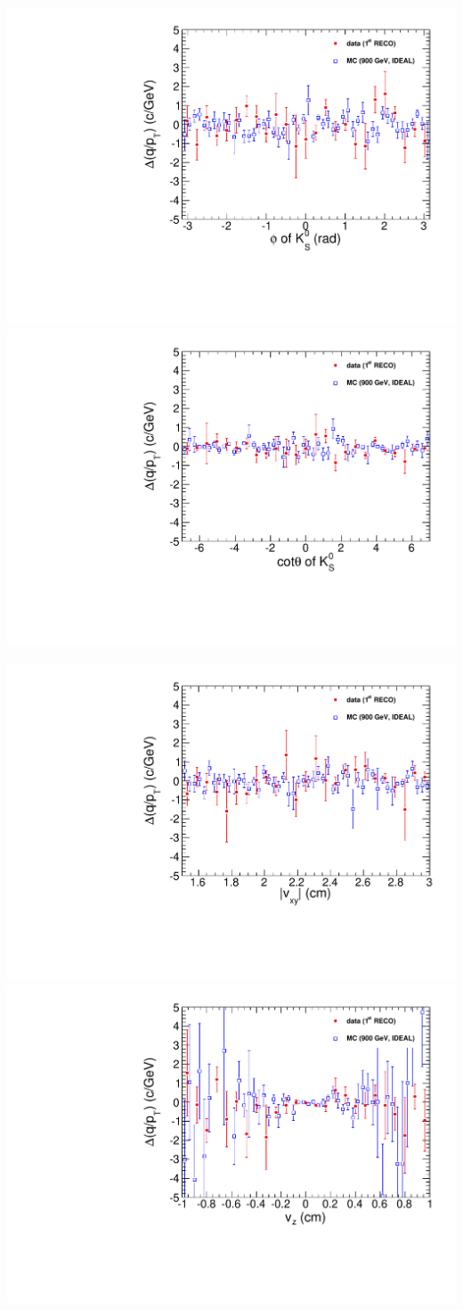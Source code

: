 \documentclass[compress]{beamer}
\begin{document}
\begin{frame}
\includegraphics[width=0.5\linewidth]{kaonTracking2_deltaqoverpt_vsphi.pdf}
\includegraphics[width=0.5\linewidth]{kaonTracking2_deltaqoverpt_vscottheta.pdf}
\end{frame}

\begin{frame}
\includegraphics[width=0.5\linewidth]{kaonTracking2_deltaqoverpt_vsvxy.pdf}
\includegraphics[width=0.5\linewidth]{kaonTracking2_deltaqoverpt_vsvz.pdf}
\end{frame}
\end{document}
